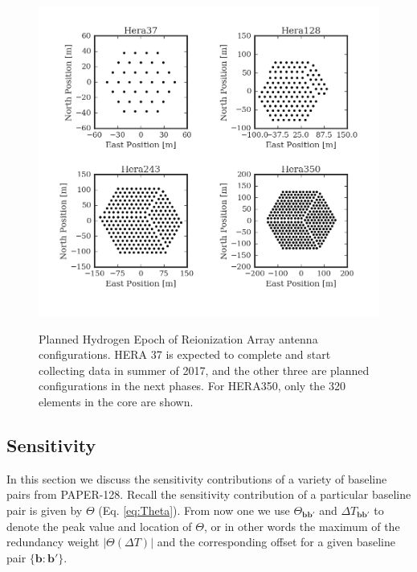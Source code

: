 \documentclass[twocolumn,apj,numberedappendix]{emulateapj}
\renewcommand\[{\begin{equation}}
\renewcommand\]{\end{equation}}
\begin{document}
\begin{figure}[h]
\includegraphics[width=\linewidth]{HeraAntpos}
\label{fig:HeraAntpos}
\caption{Planned Hydrogen Epoch of Reionization Array antenna configurations. HERA 37 is expected to complete and start collecting data in summer of 2017, and the other three are planned configurations in the next phases. For HERA350, only the 320 elements in the core are shown. }
\end{figure}

\subsection{ Sensitivity \label{sec:sensitivity}}
In this section we discuss the sensitivity contributions of a variety of baseline pairs from PAPER-128.
Recall the sensitivity contribution of a particular baseline pair is given by $\Theta$ (Eq. \eqref{eq:Theta}). From now one we use $\Theta_{\boldsymbol{bb'}}$ and $\Delta T_{\boldsymbol{bb'}}$ to denote the peak value and location of $\Theta$, or in other words the maximum of the redundancy weight $|\Theta(\Delta T)|$ and the corresponding offset for a given baseline pair $\{\boldsymbol{b}:\boldsymbol{b'}\}$. 
\end{document}
